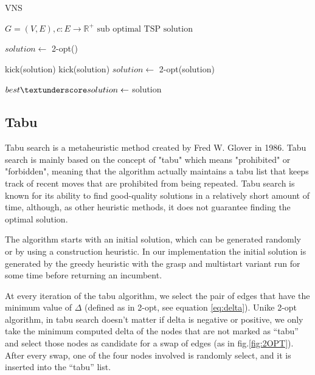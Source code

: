 \begin{algorithm}[h!]
    \caption{VNS}\label{algo:VNS}
    \begin{algorithmic}[1]
    \Require $G = (V,E), c:E \to \mathbb{R}^+$
    \Ensure $\text{sub optimal TSP solution}$


    \State $solution \gets$ 2-opt()
   
   
    \State kick(solution) 
    \State kick(solution)  
    \State $ solution \gets $ 2-opt(solution)
    
    
    \State $ best\textunderscore solution \gets$ solution
    \EndIf
    

    \EndWhile

    \end{algorithmic}
\end{algorithm}



\subsection{Tabu}
Tabu search is a metaheuristic method created by Fred W. Glover in 1986.
Tabu search is mainly based on the concept of "tabu" which means "prohibited" or "forbidden", meaning that the algorithm actually maintains a tabu list that keeps track of recent moves that are prohibited from being repeated. 
Tabu search is known for its ability to find good-quality solutions in a relatively short amount of time, although, as other heuristic methods, it does not guarantee finding the optimal solution.

The algorithm starts with an initial solution, which can be generated randomly or by using a construction heuristic. In our implementation the initial solution is generated by the greedy heuristic with the grasp and multistart variant run for some time before returning an incumbent.

At every iteration of the tabu algorithm, we select the pair of edges that have the minimum value of $\Delta$ (defined as in 2-opt, see equation \ref{eq:delta}). Unike 2-opt algorithm, in tabu search doesn't matter if delta is negative or positive, we only take the minimum computed delta of the nodes that are not marked as “tabu” and select those nodes as candidate for a swap of edges (as in fig.\ref{fig:2OPT}).  After every swap, one of the four nodes involved is randomly select, and it is inserted into the “tabu” list.

